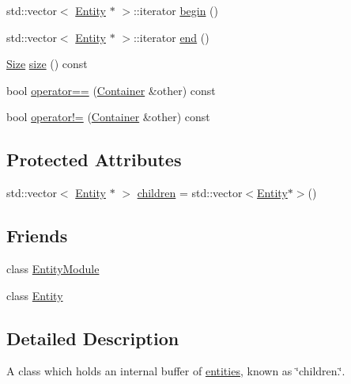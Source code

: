 \begin{DoxyCompactItemize}
\item 
std\+::vector$<$ \hyperlink{classmc_1_1_entity}{Entity} $\ast$ $>$\+::iterator \hyperlink{classmc_1_1_container_a2838fe4f6068eba635df99b8180a63a1}{begin} ()
\item 
std\+::vector$<$ \hyperlink{classmc_1_1_entity}{Entity} $\ast$ $>$\+::iterator \hyperlink{classmc_1_1_container_af8ce53fdca38afc0c38fd8dc5c7de93d}{end} ()
\item 
\hyperlink{namespacemc_ad1c06461067735b3b17e0df612532c4e}{Size} \hyperlink{classmc_1_1_container_afcba0b879415347bffedde8b43fbce8a}{size} () const 
\item 
bool \hyperlink{classmc_1_1_container_a0c35995b63b9e4a0dc05208a744b326b}{operator==} (\hyperlink{classmc_1_1_container}{Container} \&other) const 
\item 
bool \hyperlink{classmc_1_1_container_af1787e3b31159afec58ee4fffbcec013}{operator!=} (\hyperlink{classmc_1_1_container}{Container} \&other) const 
\end{DoxyCompactItemize}
\subsection*{Protected Attributes}
\begin{DoxyCompactItemize}
\item 
std\+::vector$<$ \hyperlink{classmc_1_1_entity}{Entity} $\ast$ $>$ \hyperlink{classmc_1_1_container_a61ab3823bf33ae5f8f1bfdb79501b242}{children} = std\+::vector$<$\hyperlink{classmc_1_1_entity}{Entity}$\ast$$>$()
\end{DoxyCompactItemize}
\subsection*{Friends}
\begin{DoxyCompactItemize}
\item 
class \hyperlink{classmc_1_1_container_a8dbbff2e42cb66216ff15cfa5272a1c9}{Entity\+Module}
\item 
class \hyperlink{classmc_1_1_container_a614439ccac0344926adc4c0165d64060}{Entity}
\end{DoxyCompactItemize}


\subsection{Detailed Description}
A class which holds an internal buffer of \hyperlink{classmc_1_1_entity}{entities,} known as \char`\"{}children.\char`\"{}. 

